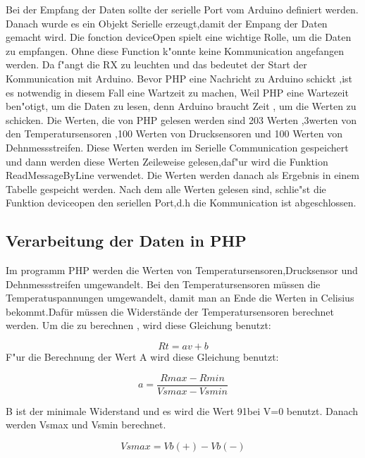 Bei der Empfang der Daten sollte der serielle Port vom Arduino definiert werden. 
Danach wurde es ein Objekt Serielle erzeugt,damit der Empang der Daten gemacht wird.
Die fonction deviceOpen spielt eine wichtige Rolle, um die Daten zu empfangen.
Ohne diese Function k"onnte keine Kommunication angefangen werden. Da f"angt die
RX zu leuchten und das bedeutet der Start der Kommunication mit Arduino.
Bevor PHP eine Nachricht zu Arduino schickt ,ist es notwendig in diesem Fall eine Wartzeit zu machen, Weil PHP eine Wartezeit 
ben"otigt, um die Daten zu lesen, denn Arduino braucht Zeit , um die Werten zu schicken.
Die Werten, die von PHP gelesen werden sind 203 Werten ,3werten von 
den Temperatursensoren ,100 Werten von Drucksensoren und 100 Werten von Dehnmessstreifen.
Diese Werten werden im Serielle Communication gespeichert und dann werden
 diese Werten Zeileweise gelesen,daf"ur wird die Funktion ReadMessageByLine verwendet.
Die Werten werden danach als Ergebnis in einem Tabelle gespeicht werden.
Nach dem alle Werten gelesen sind, schlie"st die Funktion deviceopen den seriellen Port,d.h die Kommunication ist abgeschlossen.


\subsection{Verarbeitung der Daten in PHP}

Im programm PHP werden die Werten von Temperatursensoren,Drucksensor und 
Dehnmessstreifen umgewandelt. Bei den Temperatursensoren müssen die Temperatuspannungen umgewandelt,
damit man an Ende die Werten in Celisius bekommt.Dafür müssen die Widerstände der Temperatursensoren berechnet werden.
Um die zu berechnen , wird diese Gleichung benutzt:

\begin{equation}\label{eq:paran}
 Rt = av + b
\end{equation}
 F"ur die Berechnung der Wert A wird diese Gleichung benutzt:
 
\begin{equation}\label{eq:paran}
 a = \frac{Rmax-Rmin}{Vsmax-Vsmin}
\end{equation}

B ist der minimale Widerstand und es wird die Wert 91bei V=0 benutzt.
Danach werden Vsmax und Vsmin berechnet.

\begin{equation}\label{eq:paran}
 Vsmax = Vb(+) - Vb(-)
\end{equation}

